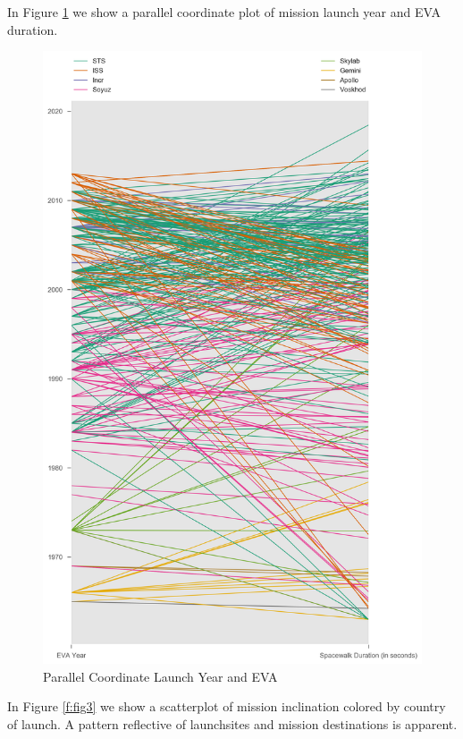 \documentclass[sigconf]{acmart}
\begin{document}
In Figure \ref{f:fig2} we show a parallel coordinate plot of mission launch year and EVA duration. 

\begin{figure}[!ht]
	\centering\includegraphics[width=\columnwidth]{images/fig2.png}
	\caption{Parallel Coordinate Launch Year and EVA}\label{f:fig2}
\end{figure}


In Figure \ref{f:fig3} we show a scatterplot of mission inclination colored by country of launch. A pattern reflective of launchsites and mission destinations is apparent.
\end{document}
